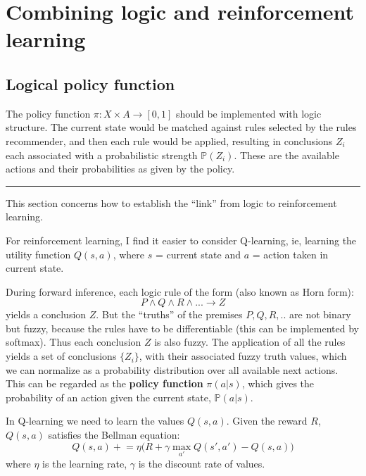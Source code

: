 \section{Combining logic and reinforcement learning}

\subsection{Logical policy function}

The policy function $\pi: X \times A \rightarrow [0,1]$ should be implemented with logic structure.  The current state would be matched against rules selected by the rules recommender, and then each rule would be applied, resulting in conclusions $Z_i$ each associated with a probabilistic strength $\mathbb{P}(Z_i)$.  These are the available actions and their probabilities as given by the policy.

\vspace{1cm} \hrule \vspace{1cm}

This section concerns how to establish the ``link'' from logic to reinforcement learning.

For reinforcement learning, I find it easier to consider Q-learning, ie, learning the utility function $Q(s,a)$, where $s$ = current state and $a$ = action taken in current state.

During forward inference, each logic rule of the form (also known as Horn form):
\begin{equation}
	P \wedge Q \wedge R \wedge ... \rightarrow Z
\end{equation}
yields a conclusion $Z$.  But the ``truths'' of the premises $P,Q,R,..$ are not binary but fuzzy, because the rules have to be differentiable (this can be implemented by softmax).  Thus each conclusion $Z$ is also fuzzy.  The application of all the rules yields a set of conclusions $\{ Z_i \}$, with their associated fuzzy truth values, which we can normalize as a probability distribution over all available next actions.  This can be regarded as the \textbf{policy function} $\pi(a|s)$, which gives the probability of an action given the current state, $\mathbb{P}(a|s)$.

In Q-learning we need to learn the values $Q(s,a)$.  Given the reward $R$, $Q(s,a)$ satisfies the Bellman equation:
\begin{equation}
	Q(s,a) \mathrel{+}= \eta \big( R + \gamma \max_{a'} Q(s',a') - Q(s,a) \big)
\end{equation}
where $\eta$ is the learning rate, $\gamma$ is the discount rate of values.

